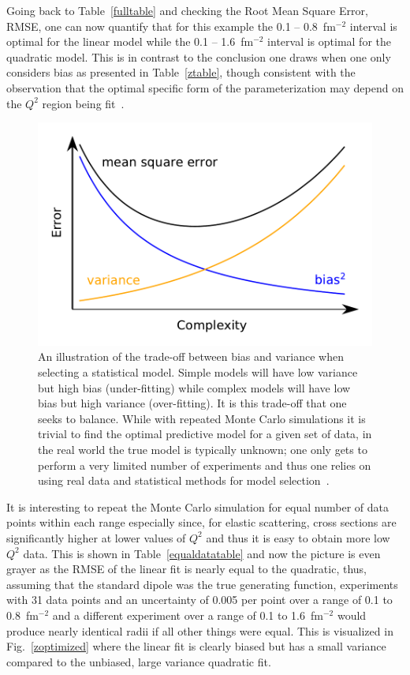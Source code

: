 \documentclass[10pt,aps,prc,twocolumn]{revtex4-1}
\begin{document}
Going back to Table~\ref{fulltable} and checking the Root Mean Square Error, RMSE, one can now quantify 
that for this example the 0.1 -- 0.8~fm$^{-2}$ interval is optimal for the linear model while the 0.1 -- 1.6~fm$^{-2}$ 
interval is optimal for the quadratic model. 
This is in contrast to the conclusion one draws when one only considers bias as presented in Table~\ref{ztable},
though consistent with the observation that the optimal specific form of the parameterization 
may depend on the $Q^2$ region being fit~\cite{Alberico:2008sz}.
\begin{figure}
\includegraphics[width=\columnwidth]{Figure/biasvariance-clean.pdf}
\caption{An illustration of the trade-off between bias and variance when selecting a statistical model.   Simple models
will have low variance but high bias (under-fitting) while complex models will have low bias but high variance (over-fitting).   
It is this trade-off that one seeks to balance.   While with repeated  Monte Carlo simulations it is trivial to find the optimal
predictive model for a given set of data, in the real world the true model is typically unknown; one only gets to perform
a very limited number of experiments and thus one relies on using real data and statistical methods for 
model selection~\cite{Hastie:2009}.}
\label{biasvariance}
\end{figure}

It is interesting to repeat the Monte Carlo simulation for equal number of data points within each range
especially since, for elastic scattering, cross sections are significantly higher at lower values of $Q^2$
and thus it is easy to obtain more low $Q^2$ data.
This is shown in Table~\ref{equaldatatable} and now the picture is even grayer as the RMSE of the linear 
fit is nearly equal to the quadratic, thus, assuming that the standard dipole was the true generating function,  experiments
with 31 data points and an uncertainty of 0.005 per point over a range of 0.1 to 0.8~fm$^{-2}$ and a different experiment
over a range of 0.1 to 1.6~fm$^{-2}$ would produce nearly identical radii if all other things were equal.
This is visualized in Fig.~\ref{zoptimized} where the linear fit is clearly biased but has a small variance compared to
the unbiased, large variance quadratic fit.
\end{document}
